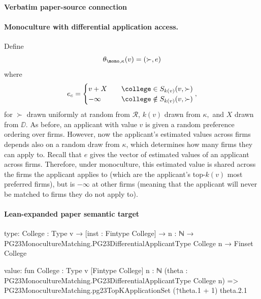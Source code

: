 \documentclass[10pt]{article}
\begin{document}
\paragraph{Verbatim paper-source connection}
\begin{ReviewVerbatim}
\paragraph{Monoculture with differential application access.} Define
\begin{equation}
    \theta_{\mono, \kappa}(v) = (\succ, e)
\end{equation}
where
\begin{equation}
    e_c =
    \begin{cases}
        v + X &\quad \college\in S_{k(v)}(v, \succ)\\
        -\infty &\quad \college\notin S_{k(v)}(v, \succ)
    \end{cases},
\end{equation}
for $\succ$ drawn uniformly at random from $\mathcal{R}$, $k(v)$ drawn from $\kappa,$ and $X$ drawn from $\DD$. As before, an applicant with value $v$ is given a random preference ordering over firms. However, now the applicant's estimated values across firms depends also on a random draw from $\kappa$, which determines how many firms they can apply to. Recall that $e$ gives the vector of estimated values of an applicant across firms. Therefore, under monoculture, this estimated value is shared across the firms the applicant applies to (which are the applicant's top-$k(v)$ most preferred firms), but is $-\infty$ at other firms (meaning that the applicant will never be matched to firms they do not apply to).
\end{ReviewVerbatim}



\paragraph{Lean-expanded paper semantic target}
\begin{ReviewVerbatim}
type:
{College : Type v} →
  [inst : Fintype College] → {n : ℕ} → PG23MonocultureMatching.PG23DifferentialApplicantType College n → Finset College

value:
fun {College : Type v} [Fintype College] {n : ℕ}
    (theta : PG23MonocultureMatching.PG23DifferentialApplicantType College n) =>
  PG23MonocultureMatching.pg23TopKApplicationSet (↑theta.1 + 1) theta.2.1
\end{ReviewVerbatim}
\end{document}

